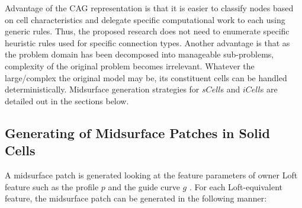 %
Advantage of the CAG representation is that it is easier to classify nodes based on cell characteristics and delegate specific computational work to each using generic rules. Thus, the proposed research does not need to enumerate specific heuristic rules used for specific connection types. Another advantage is that as the problem domain has been decomposed into manageable sub-problems, complexity of the original problem becomes irrelevant. Whatever the large/complex the original model may be, its constituent cells can be handled deterministically. Midsurface generation strategies for $sCell$s and  $iCell$s are detailed out in the sections below.
%			
\subsection{Generating of Midsurface Patches in Solid Cells}
\label{sec:scell}
A midsurface patch is generated looking at the feature parameters of owner Loft feature such as the profile $p$ and the guide curve $g$ \cite{YogeshIITG2014}.  For each Loft-equivalent feature, the midsurface patch can be generated in the following manner: 

